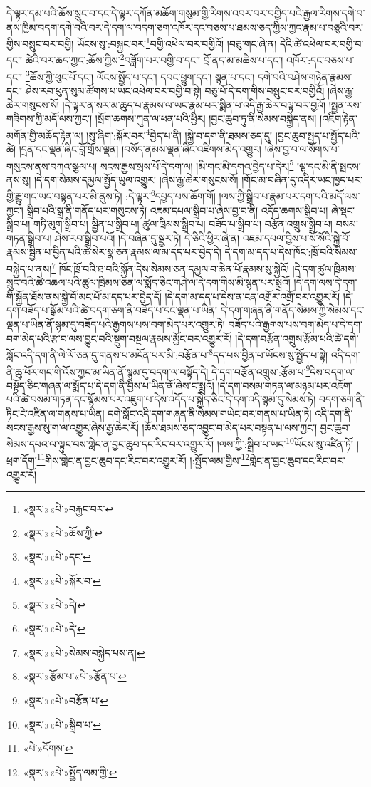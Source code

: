 དེ་ལྟར་དམ་པའི་ཆོས་སྲུང་བ་དང་དེ་ལྟར་དཀོན་མཆོག་གསུམ་གྱི་རིགས་འབར་བར་བགྱིད་པའི་རྒྱལ་རིགས་དགེ་བ་ནས་ཁྱིམ་བདག་དགེ་བའི་བར་དེ་དག་ལ་བདག་ཅག་འཁོར་དང་བཅས་པ་ཐམས་ཅད་ཀྱིས་ཀྱང་རྣམ་པ་བཅུའི་བར་གྱིས་བསྲུང་བར་བགྱི། ཡོངས་སུ་:བསྐྱང་བར་\footnote{«སྣར་»«པེ་»བརྐྱང་བར་}བགྱི་འཕེལ་བར་བགྱིའོ། །བཅུ་གང་ཞེ་ན། དེའི་ཚེ་འཕེལ་བར་བགྱི་བ་དང་། ཚེའི་བར་ཆད་ཀྱང་:ཆོས་ཀྱིས་\footnote{«སྣར་»«པེ་»ཆོས་ཀྱི་}བཟློག་པར་བགྱི་བ་དང་། བྲོ་ནད་མ་མཆིས་པ་དང་། འཁོར་:དང་བཅས་པ་དང་། \footnote{«སྣར་»«པེ་»དང་}ཆོས་ཀྱི་ཕུང་པོ་དང་། ལོངས་སྤྱོད་པ་དང་། དབང་ཕྱུག་དང་། སྙན་པ་དང་། དགེ་བའི་བཤེས་གཉེན་རྣམས་དང་། ཤེས་རབ་ཕུན་སུམ་ཚོགས་པ་ཡང་འཕེལ་བར་བགྱི་བ་སྟེ། བཅུ་པོ་དེ་དག་གིས་བསྲུང་བར་བགྱིའོ། །ཞེས་རྒྱ་ཆེར་གསུངས་སོ། །དེ་ལྟར་ན་སར་མ་ཆུད་པ་རྣམས་ལ་ཡང་རྣམ་པར་སྨིན་པ་འདི་རྒྱ་ཆེར་བལྟ་བར་བྱའོ། །སྤྱན་རས་གཟིགས་ཀྱི་མདོ་ལས་ཀྱང་། །སྲོག་ཆགས་ཀུན་ལ་ཕན་པའི་ཕྱིར། །བྱང་ཆུབ་ཏུ་ནི་སེམས་བསྐྱེད་ནས། །འཇིག་རྟེན་མགོན་གྱི་མཆོད་རྟེན་ལ། །སུ་ཞིག་:སྐོར་བར་\footnote{«སྣར་»«པེ་»སྐོར་བ་}བྱེད་པ་ནི། །སྐྱེ་བ་དག་ནི་ཐམས་ཅད་དུ། །བྱང་ཆུབ་སྤྱད་པ་སྤྱོད་པའི་ཚེ། །དྲན་དང་ལྡན་ཞིང་བློ་གྲོས་ལྡན། །བསོད་ནམས་ལྡན་ཞིང་འཇིགས་མེད་འགྱུར། །ཞེས་བྱ་བ་ལ་སོགས་པ་གསུངས་ནས་བཀའ་སྩལ་པ། སངས་རྒྱས་སྲས་པོ་དེ་དག་ལ། །མི་གང་མི་དགའ་བྱེད་པ་དེར།\footnote{«སྣར་»«པེ་»དེ།} །ལྷ་དང་མི་ནི་སྤངས་ནས་སུ། །དེ་དག་སེམས་དམྱལ་སྤྱོད་ཡུལ་འགྱུར། །ཞེས་རྒྱ་ཆེར་གསུངས་སོ། །གོང་མ་བཞིན་དུ་འདིར་ཡང་ཁྱད་པར་གྱི་རྒྱུ་གང་ཡང་བསྟན་པར་མི་ནུས་ཏེ། :དེ་ལྟར་\footnote{«སྣར་»«པེ་»དེ་}དཔྱད་པས་ཆོག་གོ། །ལས་ཀྱི་སྒྲིབ་པ་རྣམ་པར་དག་པའི་མདོ་ལས་ཀྱང་། སྒྲིབ་པའི་སྒྲ་ནི་གནོད་པར་གསུངས་ཏེ། འཇམ་དཔལ་སྒྲིབ་པ་ཞེས་བྱ་བ་ནི། འདོད་ཆགས་སྒྲིབ་པ། ཞེ་སྡང་སྒྲིབ་པ། གཏི་མུག་སྒྲིབ་པ། སྦྱིན་པ་སྒྲིབ་པ། ཚུལ་ཁྲིམས་སྒྲིབ་པ། བཟོད་པ་སྒྲིབ་པ། བརྩོན་འགྲུས་སྒྲིབ་པ། བསམ་གཏན་སྒྲིབ་པ། ཤེས་རབ་སྒྲིབ་པའོ། །དེ་བཞིན་དུ་སྦྱར་ཏེ། དེ་ཅིའི་ཕྱིར་ཞེ་ན། འཇམ་དཔལ་བྱིས་པ་སོ་སོའི་སྐྱེ་བོ་རྣམས་སྦྱིན་པ་བྱིན་པའི་ཚེ་སེར་སྣ་ཅན་རྣམས་ལ་མ་དད་པར་བྱེད་དེ། དེ་དག་མ་དད་པ་དེས་ཁོང་:ཁྲོ་བའི་སེམས་བསྐྱེད་པ་ནས།\footnote{«སྣར་»«པེ་»སེམས་བསྐྱེད་པས་ན།} ཁོང་ཁྲོ་བའི་ཐ་བའི་སྐྱོན་དེས་སེམས་ཅན་དམྱལ་བ་ཆེན་པོ་རྣམས་སུ་སྐྱེའོ། །དེ་དག་ཚུལ་ཁྲིམས་སྲུང་བའི་ཚེ་འཆལ་པའི་ཚུལ་ཁྲིམས་ཅན་ལ་སྨོད་ཅིང་གཤེ་ལ་དེ་དག་གིས་མི་སྙན་པར་སྨྲའོ། །དེ་དག་ལས་དེ་དག་གི་སྐྱོན་ཐོས་ནས་སྐྱེ་བོ་མང་པོ་མ་དད་པར་བྱེད་དོ། །དེ་དག་མ་དད་པ་དེས་ན་ངན་འགྲོར་འགྲོ་བར་འགྱུར་རོ། །དེ་དག་བཟོད་པ་སྒོམ་པའི་ཚེ་བདག་ཅག་ནི་བཟོད་པ་དང་ལྡན་པ་ཡིན། དེ་དག་གཞན་ནི་གནོད་སེམས་ཀྱི་སེམས་དང་ལྡན་པ་ཡིན་ནོ་སྙམ་དུ་བཟོད་པའི་རྒྱགས་པས་བག་མེད་པར་འགྱུར་ཏེ། བཟོད་པའི་རྒྱགས་པས་བག་མེད་པ་དེ་དག་བག་མེད་པའི་རྩ་བ་ལས་བྱུང་བའི་སྡུག་བསྔལ་རྣམས་མྱོང་བར་འགྱུར་རོ། །དེ་དག་བརྩོན་འགྲུས་རྩོམ་པའི་ཚེ་དགེ་སློང་འདི་དག་ནི་ལེ་ལོ་ཅན་དུ་གནས་པ་མངོན་པར་མི་:བརྩོན་པ་\footnote{«སྣར་»རྩོམ་པ་«པེ་»རྩོན་པ་}དད་པས་བྱིན་པ་ཡོངས་སུ་སྤྱོད་པ་སྟེ། འདི་དག་ནི་ཆུ་ཕོར་གང་གི་འོས་ཀྱང་མ་ཡིན་ནོ་སྙམ་དུ་བདག་ལ་བསྟོད་དེ། དེ་དག་བརྩོན་འགྲུས་:རྩོམ་པ་\footnote{«སྣར་»«པེ་»བརྩོན་པ་}དེས་བདག་ལ་བསྟོད་ཅིང་གཞན་ལ་སྨོད་པ་དེ་དག་ནི་བྱིས་པ་ཡིན་ནོ་ཞེས་ང་སྨྲའོ། །དེ་དག་བསམ་གཏན་ལ་མཉམ་པར་འཇོག་པའི་ཚེ་བསམ་གཏན་དང་སྙོམས་པར་འཇུག་པ་དེས་འདོད་པ་སྐྱེད་ཅིང་དེ་དག་འདི་སྙམ་དུ་སེམས་ཏེ། བདག་ཅག་ནི་ཏིང་ངེ་འཛིན་ལ་གནས་པ་ཡིན། དགེ་སློང་འདི་དག་གཞན་ནི་སེམས་གཡེང་བར་གནས་པ་ཡིན་ཏེ། འདི་དག་ནི་སངས་རྒྱས་སུ་ག་ལ་འགྱུར་ཞེས་རྒྱ་ཆེར་རོ། །ཆོས་ཐམས་ཅད་འབྱུང་བ་མེད་པར་བསྟན་པ་ལས་ཀྱང་། བྱང་ཆུབ་སེམས་དཔའ་ལ་ལྟུང་བས་གླེང་ན་བྱང་ཆུབ་དང་རིང་བར་འགྱུར་རོ། །ལས་ཀྱི་:སྒྲིབ་པ་ཡང་\footnote{«སྣར་»«པེ་»སྒྲིབ་པ་}ཡོངས་སུ་འཛིན་ཏོ། །ཕྲག་དོག་\footnote{«པེ་»དོགས་}གིས་གླེང་ན་བྱང་ཆུབ་དང་རིང་བར་འགྱུར་རོ། །:སྤྱོད་ལམ་གྱིས་\footnote{«སྣར་»«པེ་»སྤྱོད་ལམ་གྱི་}གླེང་ན་བྱང་ཆུབ་དང་རིང་བར་འགྱུར་རོ། 